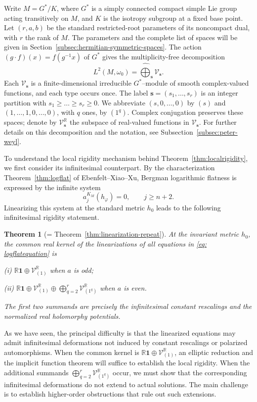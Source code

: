 \documentclass[11pt,reqno]{amsart}
\newtheorem{theorem}{Theorem}[section]
\theoremstyle{corollary}
\theoremstyle{conjecture}
\theoremstyle{assumption}
\theoremstyle{proposition}
\theoremstyle{remark}
\numberwithin{equation}{section}
\begin{document}
Write $M=G^*/K$, where $G^*$ is a simply connected compact simple Lie group acting transitively on $M$, and $K$ is the isotropy subgroup at a fixed base point. Let $(r,a,b)$ be the standard restricted-root parameters of its noncompact dual, with $r$ the rank of $M$. The parameters and the complete list of spaces will be given in Section~\ref{subsec:hermitian-symmetric-spaces}. The action $(g\cdot f)(x)=f(g^{-1}x)$ of $G^*$ gives the multiplicity-free decomposition
\[
L^2(M,\omega_0)=\widehat{\bigoplus}_{\mathbf s}\mathcal V_{\mathbf s}.
\]
Each $\mathcal V_{\mathbf s}$ is a finite-dimensional irreducible $G^*$--module of smooth complex-valued functions, and each type occurs once. The label $\mathbf s=(s_1,\ldots,s_r)$ is an integer partition with $s_1\geq \ldots\geq s_r\geq 0$. We abbreviate $(s,0,\ldots,0)$ by $(s)$ and $(1,\ldots,1,0,\ldots,0)$, with $q$ ones, by $(1^q)$. Complex conjugation preserves these spaces; denote by $\mathcal V_{\mathbf s}^{\mathbb R}$ the subspace of real-valued functions in $\mathcal V_{\mathbf s}$. For further details on this decomposition and the notation, see Subsection~\ref{subsec:peter-weyl}.

To understand the local rigidity mechanism behind Theorem~\ref{thm:localrigidity}, we first consider its infinitesimal counterpart. By the characterization Theorem~\ref{thm:logflat} of Ebenfelt--Xiao--Xu, Bergman logarithmic flatness is expressed by the infinite system
\begin{equation}\label{eq: logflatequation}
a^{K_M}_j(h_\varphi)=0,\qquad j\geq n+2.
\end{equation}
Linearizing this system at the standard metric $h_0$ leads to the following infinitesimal rigidity statement.

\begin{theorem}[= Theorem~\ref{thm:linearization-repeat}]\label{thm:linearization}
At the invariant metric $h_0$, the common real kernel of the linearizations of all equations in \eqref{eq: logflatequation} is

(i) $\mathbb{R}\mathbf{1}\oplus \mathcal{V}_{(1)}^{\mathbb{R}}$ when $a$ is odd;

(ii) $\mathbb{R}\mathbf{1}\oplus \mathcal{V}_{(1)}^{\mathbb{R}}\oplus \bigoplus_{q=2}^r \mathcal{V}_{(1^q)}^{\mathbb{R}}$ when $a$ is even.

The first two summands are precisely the infinitesimal constant rescalings and the normalized real holomorphy potentials.
\end{theorem}

As we have seen, the principal difficulty is that the linearized equations may admit infinitesimal deformations not induced by constant rescalings or polarized automorphisms. When the common kernel is $\mathbb R\mathbf 1\oplus\mathcal V_{(1)}^{\mathbb R}$, an elliptic reduction and the implicit function theorem will suffice to establish the local rigidity. When the additional summands $\bigoplus_{q=2}^r\mathcal V_{(1^q)}^{\mathbb R}$ occur, we must show that the corresponding infinitesimal deformations do not extend to actual solutions. The main challenge is to establish higher-order obstructions that rule out such extensions.
\end{document}
